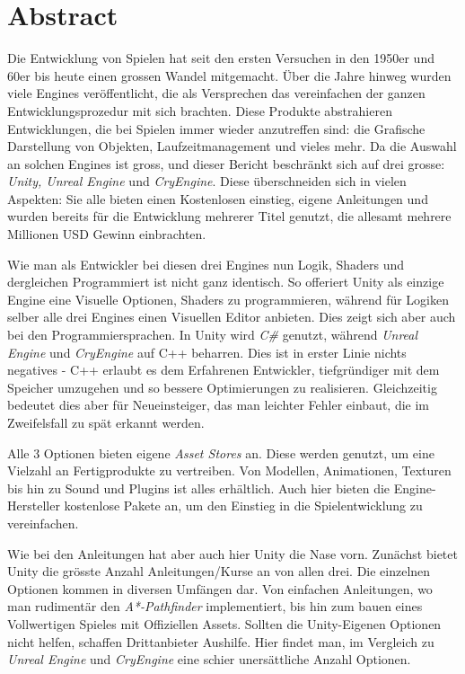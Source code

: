 

\cleardoublepage
\chapter*{Abstract}
\par Die Entwicklung von Spielen hat seit den ersten Versuchen in den 1950er und 60er bis heute einen grossen Wandel mitgemacht. Über die Jahre hinweg wurden viele Engines veröffentlicht, die als Versprechen das vereinfachen der
ganzen Entwicklungsprozedur mit sich brachten. Diese Produkte abstrahieren Entwicklungen, die bei Spielen immer wieder anzutreffen sind: die Grafische Darstellung von Objekten, Laufzeitmanagement und vieles mehr. Da die Auswahl an solchen Engines ist gross, und dieser Bericht beschränkt sich auf drei grosse: \emph{Unity, Unreal Engine} und \emph{CryEngine}. Diese überschneiden sich in vielen Aspekten: Sie alle bieten einen Kostenlosen einstieg, eigene Anleitungen und wurden bereits für die Entwicklung mehrerer Titel genutzt, die allesamt mehrere Millionen USD Gewinn einbrachten.

\par Wie man als Entwickler bei diesen drei Engines nun Logik, Shaders und dergleichen Programmiert ist nicht ganz identisch. So offeriert Unity als einzige Engine eine Visuelle Optionen, Shaders zu programmieren, während für Logiken selber alle drei Engines einen Visuellen Editor anbieten. Dies zeigt sich aber auch bei den Programmiersprachen. In Unity wird \emph{C\#} genutzt, während \emph{Unreal Engine} und \emph{CryEngine} auf C++ beharren. Dies ist in erster Linie nichts negatives - C++ erlaubt es dem Erfahrenen Entwickler, tiefgründiger mit dem Speicher umzugehen und so bessere Optimierungen zu realisieren. Gleichzeitig bedeutet dies aber für Neueinsteiger, das man leichter Fehler einbaut, die im Zweifelsfall zu spät erkannt werden.

\par Alle 3 Optionen bieten eigene \emph{Asset Stores} an. Diese werden genutzt, um eine Vielzahl an Fertigprodukte zu vertreiben. Von Modellen, Animationen, Texturen bis hin zu Sound und Plugins ist alles erhältlich. Auch hier bieten die Engine-Hersteller kostenlose Pakete an, um den Einstieg in die Spielentwicklung zu vereinfachen.

\par Wie bei den Anleitungen hat aber auch hier Unity die Nase vorn. Zunächst bietet Unity die grösste Anzahl Anleitungen/Kurse an von allen drei. Die einzelnen Optionen kommen in diversen Umfängen dar. Von einfachen Anleitungen, wo man rudimentär den \emph{A*-Pathfinder} implementiert, bis hin zum bauen eines Vollwertigen Spieles mit Offiziellen Assets. Sollten die Unity-Eigenen Optionen nicht helfen, schaffen Drittanbieter Aushilfe. Hier findet man, im Vergleich zu \emph{Unreal Engine} und \emph{CryEngine} eine schier unersättliche Anzahl Optionen. 

